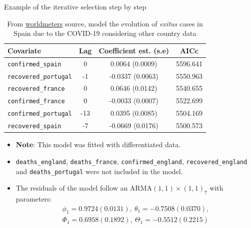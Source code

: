 \documentclass[10pt]{beamer}
\begin{document}
\begin{frame}{Example of the iterative selection step by step}


    \begin{table}
        \centering\small
        \setlength{\tabcolsep}{5pt}
        \caption{From \href{https://www.worldometers.info/coronavirus/}{worldmeters} source, model the evolution of \textit{exitus} cases in Spain due to the COVID-19 considering other country data} 
        \label{covid19}
    
        \begin{tabular}{|l|ccc|}
            \hline
            \textbf{Covariate}           & \textbf{Lag}  & \textbf{Coefficient est. (s.e)} & \textbf{AICc}          \\ 
            \hline 
            \texttt{confirmed\_spain}    & 0             & 0.0064 (0.0009)                 & 5596.641             \\ 
            \texttt{recovered\_portugal} & -1            & -0.0337 (0.0063)                & 5550.963             \\
            \texttt{recovered\_france}   & 0             & 0.0646 (0.0142)                 & 5540.655             \\
            \texttt{confirmed\_france}   & 0             & -0.0033 (0.0007)                & 5522.699             \\
            \texttt{confirmed\_portugal} & -13           & 0.0395 (0.0085)                 & 5504.169             \\
            \texttt{recovered\_spain}    & -7            & -0.0669 (0.0176)                & 5500.573             \\ 
            \hline 
        \end{tabular}
    \end{table}    
    \begin{itemize}
        \item \textbf{Note}: This model was fitted with differentiated data.
        \item \texttt{deaths\_england}, \texttt{deaths\_france}, \texttt{confirmed\_england}, \texttt{recovered\_england} and \texttt{deaths\_portugal} were not included in the model.
        \item The residuals of the model follow an ARMA$(1,1)\times (1,1)_7$ with parameters:
        \[
        \begin{array}{l}
            \phi_1=0.9724 (0.0131), \ \theta_1=-0.7508 (0.0370), \\
            \Phi_1=0.6958 (0.1892), \ \Theta_1=-0.5512 (0.2215)
        \end{array}
        \] 
    \end{itemize}
\end{frame}
\end{document}
